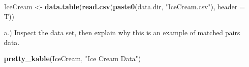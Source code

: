 \documentclass[
  12pt,
]{report}
\newenvironment{Shaded}{\begin{snugshade}}{\end{snugshade}}
\newcommand{\DataTypeTok}[1]{\textcolor[rgb]{0.13,0.29,0.53}{#1}}
\newcommand{\KeywordTok}[1]{\textcolor[rgb]{0.13,0.29,0.53}{\textbf{#1}}}
\newcommand{\NormalTok}[1]{#1}
\newcommand{\StringTok}[1]{\textcolor[rgb]{0.31,0.60,0.02}{#1}}
\begin{document}
\begin{Shaded}
\begin{Highlighting}[]
\NormalTok{IceCream <-}\StringTok{ }\KeywordTok{data.table}\NormalTok{(}\KeywordTok{read.csv}\NormalTok{(}\KeywordTok{paste0}\NormalTok{(data.dir, }\StringTok{"IceCream.csv"}\NormalTok{),}
                               \DataTypeTok{header =}\NormalTok{ T))}
\end{Highlighting}
\end{Shaded}

a.) Inspect the data set, then explain why this is an example of matched
pairs data.

\begin{Shaded}
\begin{Highlighting}[]
\KeywordTok{pretty_kable}\NormalTok{(IceCream, }\StringTok{"Ice Cream Data"}\NormalTok{)}
\end{Highlighting}
\end{Shaded}
\end{document}

